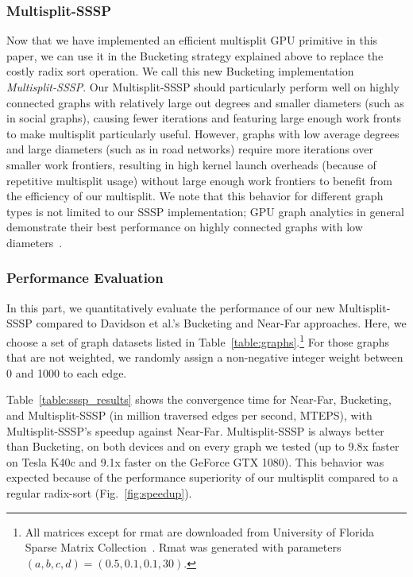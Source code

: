 \subsubsection{Multisplit-SSSP} Now that we have implemented an efficient multisplit GPU primitive in this paper, we can use it in the Bucketing strategy explained above to replace the costly radix sort operation. We call this new Bucketing implementation \emph{Multisplit-SSSP}\@.
Our Multisplit-SSSP should particularly perform well on highly connected graphs with relatively large out degrees and smaller diameters (such as in social graphs), causing fewer iterations and featuring large enough work fronts to make multisplit particularly useful. However, graphs with low average degrees and large diameters (such as in road networks) require more iterations over smaller work frontiers, resulting in high kernel launch overheads (because of repetitive multisplit usage) without large enough work frontiers to benefit from the efficiency of our multisplit.
We note that this behavior for different graph types is not limited to our SSSP implementation; GPU graph analytics in general demonstrate their best performance on highly connected graphs with low diameters~\cite{Wang:2016:GAH:nourl}.

\subsubsection{Performance Evaluation}\label{subsubsec:perf_eval_sssp}
In this part, we quantitatively evaluate the performance of our new Multisplit-SSSP compared to Davidson et al.'s Bucketing and Near-Far approaches.
Here, we choose a set of graph datasets listed in Table~\ref{table:graphs}.\footnote{All matrices except for rmat are downloaded from University of Florida Sparse Matrix Collection~\cite{Davis:2011:UOF}. Rmat was generated with parameters $(a,b,c,d) = (0.5, 0.1, 0.1, 30)$.}
For those graphs that are not weighted, we randomly assign a non-negative integer weight between 0 and 1000 to each edge.

Table~\ref{table:sssp_results} shows the convergence time for Near-Far, Bucketing, and Multisplit-SSSP (in million traversed edges per second, MTEPS), with Multisplit-SSSP's speedup against Near-Far.
Multisplit-SSSP is always better than Bucketing, on both devices and on every graph we tested (up to 9.8x faster on Tesla K40c and 9.1x faster on the GeForce GTX 1080).
This behavior was expected because of the performance superiority of our multisplit compared to a regular radix-sort (Fig.~\ref{fig:speedup}).

